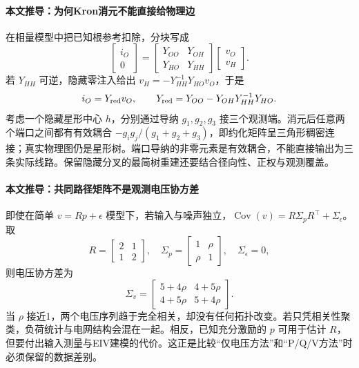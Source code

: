 \documentclass[UTF8,11pt,fontset=fandol]{ctexart}
\DeclareMathOperator{\Cov}{Cov}
\theoremstyle{remark}
\numberwithin{equation}{section}
\begin{document}
\paragraph{本文推导：为何Kron消元不能直接给物理边}
在相量模型中把已知根参考扣除，分块写成
\begin{equation}
 \begin{bmatrix}i_O\\0\end{bmatrix}=
 \begin{bmatrix}Y_{OO}&Y_{OH}\\Y_{HO}&Y_{HH}\end{bmatrix}
 \begin{bmatrix}v_O\\v_H\end{bmatrix}.
\end{equation}
若 $Y_{HH}$ 可逆，隐藏零注入给出 $v_H=-Y_{HH}^{-1}Y_{HO}v_O$，于是
\begin{equation}
 i_O=Y_{\rm red}v_O,\qquad
 Y_{\rm red}=Y_{OO}-Y_{OH}Y_{HH}^{-1}Y_{HO}.
\end{equation}
考虑一个隐藏星形中心 $h$，分别通过导纳 $g_1,g_2,g_3$ 接三个观测端。消元后任意两个端口之间都有有效耦合 $-g_ig_j/(g_1+g_2+g_3)$，即约化矩阵呈三角形稠密连接；真实物理图仍是星形树。端口导纳的非零元素是有效耦合，不能直接输出为三条实际线路。保留隐藏分叉的最简树重建还要结合径向性、正权与观测覆盖。

\paragraph{本文推导：共同路径矩阵不是观测电压协方差}
即使在简单 $v=Rp+\epsilon$ 模型下，若输入与噪声独立，$\Cov(v)=R\Sigma_pR^\top+\Sigma_\epsilon$。取
\begin{equation}
 R=\begin{bmatrix}2&1\\1&2\end{bmatrix},\quad
 \Sigma_p=\begin{bmatrix}1&\rho\\\rho&1\end{bmatrix},\quad\Sigma_\epsilon=0,
\end{equation}
则电压协方差为
\begin{equation}
 \Sigma_v=\begin{bmatrix}5+4\rho&4+5\rho\\4+5\rho&5+4\rho\end{bmatrix}.
\end{equation}
当 $\rho$ 接近1，两个电压序列趋于完全相关，却没有任何拓扑改变。若只凭相关性聚类，负荷统计与电网结构会混在一起。相反，已知充分激励的 $p$ 可用于估计 $R$，但要付出输入测量与EIV建模的代价。这正是比较“仅电压方法”和“P/Q/V方法”时必须保留的数据差别。
\end{document}
